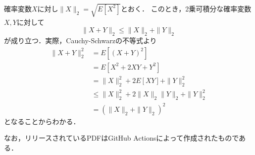 \documentclass{jsarticle}
\begin{document}
確率変数$X$に対し$\|X\|_2=\sqrt{E[X^2]}$とおく．
このとき，2乗可積分な確率変数$X,Y$に対して
\[ \|X+Y\|_2\leq\|X\|_2+\|Y\|_2 \]
が成り立つ．実際，Cauchy-Schwarzの不等式より
\begin{align*}
\|X+Y\|_2^2
&=E[(X+Y)^2] \\
&=E[X^2+2XY+Y^2] \\
&=\|X\|_2^2+2E[XY]+\|Y\|_2^2 \\
&\leq\|X\|_2^2+2\|X\|_2\|Y\|_2+\|Y\|_2^2 \\
&=(\|X\|_2+\|Y\|_2)^2
\end{align*}
となることからわかる．
 
なお，リリースされているPDFはGitHub Actionsによって作成されたものである．
\end{document}

